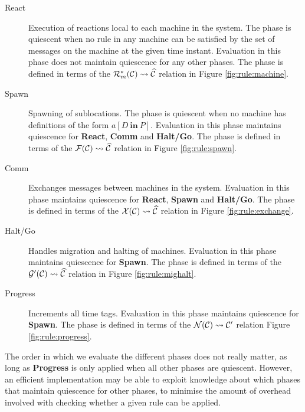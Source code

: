 \begin{description}
 \item[React] Execution of reactions local to each machine in the system. The
 phase is quiescent when no rule in any machine can be satisfied by the set of
 messages on the machine at the given time instant. Evaluation in this phase
 does not maintain quiescence for any other phases. The phase is defined in
 terms of the $\mathcal{R}_m^*(\mathcal{C}) \leadsto \widehat{\mathcal{C}}$ relation in Figure
 \ref{fig:rule:machine}.

 \item[Spawn] Spawning of sublocations. The phase is quiescent when no machine
 has definitions of the form $a[D~\mathbf{in}~P]$. Evaluation in this phase
 maintains quiescence for \textbf{React}, \textbf{Comm} and \textbf{Halt/Go}.
 The phase is defined in terms of the $\mathcal{F}(\mathcal{C}) \leadsto \widehat{\mathcal{C}}$ relation in
 Figure \ref{fig:rule:spawn}.

 \item[Comm] Exchanges messages between machines in the system. Evaluation in
 this phase maintains quiescence for \textbf{React}, \textbf{Spawn} and
 \textbf{Halt/Go}. The phase is defined in terms of the $\mathcal{X}(\mathcal{C}) \leadsto
 \widehat{\mathcal{C}}$ relation in Figure \ref{fig:rule:exchange}.

 \item[Halt/Go] Handles migration and halting of machines. Evaluation in this
 phase maintains quiescence for \textbf{Spawn}. The phase is defined in terms of
 the $\mathcal{G}'(\mathcal{C}) \leadsto \widehat{\mathcal{C}}$ relation in Figure \ref{fig:rule:mighalt}.

 \item[Progress] Increments all time tags. Evaluation in this phase maintains
 quiescence for \textbf{Spawn}. The phase is defined in terms of the $\mathcal{N}(\mathcal{C})
 \leadsto \mathcal{C}'$ relation Figure \ref{fig:rule:progress}.
\end{description}

The order in which we evaluate the different phases does not really matter, as
long as \textbf{Progress} is only applied when all other phases are quiescent.
However, an efficient implementation may be able to exploit knowledge about
which phases that maintain quiescence for other phases, to minimise the amount
of overhead involved with checking whether a given rule can be applied.

